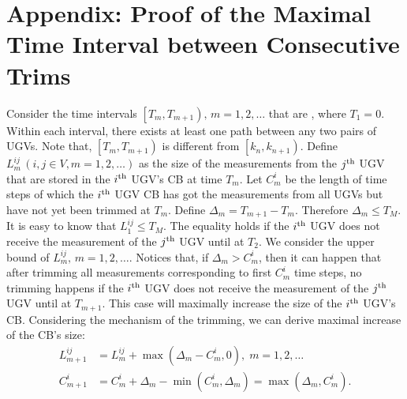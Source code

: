 \appendix
	\section*{Appendix: Proof of the Maximal Time Interval between Consecutive Trims}
	
	Consider the time intervals $\left[T_m,T_{m+1} \right),\,m=1,2,\dots$ that are {\fc}, where $T_1=0$.
	Within each interval, there exists at least one path between any two pairs of UGVs.
	Note that, $\left[T_m,T_{m+1}\right)$ is different from $\left[k_n,k_{n+1}\right)$.
	Define $L^{ij}_m\,(i,j\in V, m=1,2,\dots)$ as the size of the measurements from the $j^\text{th}$ UGV that are stored in the $i^\text{th}$ UGV's CB at time $T_m$.
	Let $C^i_m$ be the length of time steps of which the $i^\text{th}$ UGV CB has got the measurements from all UGVs but have not yet been trimmed at $T_m$.
	Define $\Delta_m = T_{m+1}-T_m$. 
	Therefore $\Delta_m \le T_M$.
	It is easy to know that $L^{ij}_1\le T_M$. 
	The equality holds if the $i^\text{th}$ UGV does not receive the measurement of the $j^\text{th}$ UGV until at $T_2$.
	We consider the upper bound of $L^{ij}_m,\,m=1,2,\dots$.
	Notices that, if $\Delta_m>C^i_m$, then it can happen that after trimming all measurements corresponding to first $C^i_m$ time steps, no trimming happens if the $i^\text{th}$ UGV does not receive the measurement of the $j^\text{th}$ UGV until at $T_{m+1}$.
	This case will maximally increase the size of the $i^\text{th}$ UGV's CB.
	Considering the mechanism of the trimming, we can derive maximal increase of the CB's size:
	\begin{align*}
	L^{ij}_{m+1} &= L^{ij}_{m}+\max(\Delta_{m}-C^i_{m},0),\;m=1,2,\dots\\
	C^i_{m+1}&=C^i_m+\Delta_m-\min(C^i_m,\Delta_m)=\max(\Delta_m,C^i_m).
	\end{align*}
	
